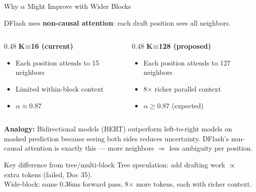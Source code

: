 \documentclass[10pt]{beamer}
\begin{document}
\begin{frame}{Why $\alpha$ Might Improve with Wider Blocks}

DFlash uses \textbf{non-causal attention}: each draft position sees all neighbors.

\begin{columns}[T]
\begin{column}{0.48\textwidth}
\textbf{K=16 (current)}
\begin{itemize}
  \item Each position attends to 15 neighbors
  \item Limited within-block context
  \item $\alpha \approx 0.87$
\end{itemize}
\end{column}
\begin{column}{0.48\textwidth}
\textbf{K=128 (proposed)}
\begin{itemize}
  \item Each position attends to 127 neighbors
  \item 8$\times$ richer parallel context
  \item $\alpha \geq 0.87$ (expected)
\end{itemize}
\end{column}
\end{columns}

\vspace{0.8em}
\textbf{Analogy:} Bidirectional models (BERT) outperform left-to-right models on masked prediction because seeing both sides reduces uncertainty. DFlash's non-causal attention is exactly this --- more neighbors $\Rightarrow$ less ambiguity per position.

\vspace{0.5em}
\begin{alertblock}{Key difference from tree/multi-block}
Tree speculation: add drafting work $\propto$ extra tokens (failed, Doc 35).\\
Wide-block: same 0.36ms forward pass, 8$\times$ more tokens, each with richer context.
\end{alertblock}
\end{frame}
\end{document}
